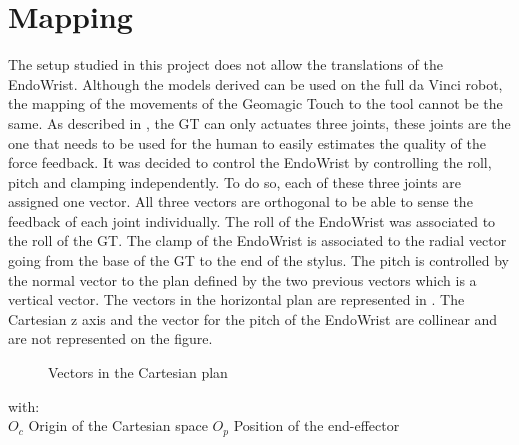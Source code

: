 \section{Mapping}

The setup studied in this project does not allow the translations of the EndoWrist. Although the models derived can be used on the full da Vinci robot, the mapping of the movements of the Geomagic Touch to the tool cannot be the same. As described in , the GT can only actuates three joints, these joints are the one that needs to be used for the human to easily estimates the quality of the force feedback. It was decided to control the EndoWrist by controlling the roll, pitch and clamping independently. To do so, each of these three joints are assigned one vector. All three vectors are orthogonal to be able to sense the feedback of each joint individually.
The roll of the EndoWrist was associated to the roll of the GT. The clamp of the EndoWrist is associated to the radial vector going from the base of the GT to the end of the stylus. The pitch is controlled by the normal vector to the plan defined by the two previous vectors which is a vertical vector. The vectors in the horizontal plan are represented in . The Cartesian z axis and the vector for the pitch of the EndoWrist are collinear and are not represented on the figure.
\\

\begin{figure}[H]
\label{fig:cartesian_polar}
\caption{Vectors in the Cartesian plan}
\end{figure}
with:\\
	\hspace*{8mm} $O_c$ Origin of the Cartesian space
	\space*{8mm} $O_p$ Position of the end-effector


